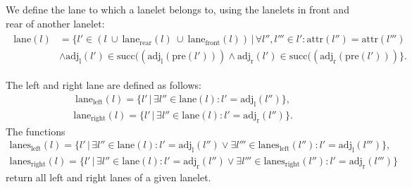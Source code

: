 We define the lane to which a lanelet belongs to, using the lanelets in front and rear of another lanelet:
\begin{align}
\begin{split}
\mathrm{lane}(l) &=  %
\big\{l' \in (l \ \cup \ \mathrm{lane}_\mathrm{rear}(l)  \ \cup \ \mathrm{lane}_\mathrm{front}(l))   \, \big| \, \forall l'', l''' \in l': \mathrm{attr}(l'') = \mathrm{attr}(l''') \\
& \land \mathrm{adj}_\mathrm{l}(l') \in \mathrm{succ}((\mathrm{adj}_\mathrm{l}(\mathrm{pre}(l'))) \land \mathrm{adj}_\mathrm{r}(l') \in \mathrm{succ}((\mathrm{adj}_\mathrm{r}(\mathrm{pre}(l'))) \big\}.
\end{split}
\end{align}

The left and right lane are defined as follows:
\begin{align}
\mathrm{lane}_\mathrm{left}(l) =\big\{l' \, \big| \, \exists l'' \in \mathrm{lane}(l) : l' = \mathrm{adj}_\mathrm{l}(l'') \big\},
\end{align}
\begin{align}
\mathrm{lane}_\mathrm{right}(l) =\big\{l' \, \big| \, \exists l'' \in \mathrm{lane}(l) : l' = \mathrm{adj}_\mathrm{r}(l'') \big\}.
\end{align}
The functions
\begin{align}
\mathrm{lanes}_\mathrm{left}(l) =\big\{l' \, \big| \, \exists l'' \in \mathrm{lane}(l) : l' = \mathrm{adj}_\mathrm{l}(l'') \lor \exists l''' \in \mathrm{lanes}_\mathrm{left}(l'')  : l' = \mathrm{adj}_\mathrm{l}(l''') \big\},
\end{align}
\begin{align}
\mathrm{lanes}_\mathrm{right}(l) =\big\{l' \, \big| \, \exists l'' \in \mathrm{lane}(l) : l' = \mathrm{adj}_\mathrm{r}(l'') \lor \exists l''' \in \mathrm{lanes}_\mathrm{right}(l'')  : l' =\mathrm{adj}_\mathrm{r}(l''') \big\}
\end{align}
return all left and right lanes of a given lanelet.

